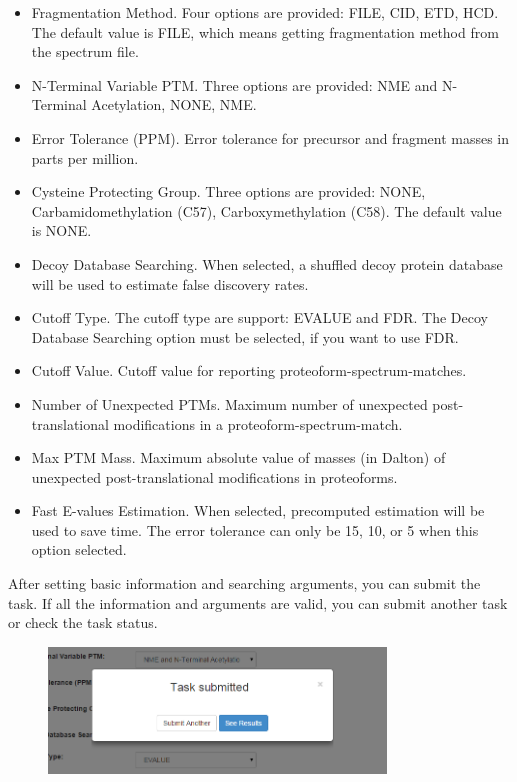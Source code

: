 \documentclass[12pt,letterpaper]{article}
\begin{document}
\begin{itemize}
\item Fragmentation Method. Four options are provided: FILE, CID, ETD, HCD. The
default value is FILE, which means getting fragmentation method from the
spectrum file.
\item N-Terminal Variable PTM. Three options are provided: NME and N-Terminal Acetylation, NONE, NME.
\item Error Tolerance (PPM). Error tolerance for precursor and fragment masses 
in parts per million.
\item Cysteine Protecting Group. Three options are provided: NONE, 
Carbamidomethylation (C57), Carboxymethylation (C58). The default value is NONE.
\item Decoy Database Searching. When selected, a shuffled decoy protein database
will be used to estimate false discovery rates.
\item Cutoff Type. The cutoff type are support: EVALUE and FDR. The Decoy Database Searching option must be selected, if you want to use FDR.
\item Cutoff Value. Cutoff value for reporting proteoform-spectrum-matches.
\item Number of Unexpected PTMs. Maximum number of unexpected post-translational modifications in a proteoform-spectrum-match.
\item Max PTM Mass. Maximum absolute value of masses (in Dalton) of unexpected post-translational modifications in proteoforms.
\item Fast E-values Estimation. When selected, precomputed estimation will be
used to save time. The error tolerance can only be 15, 10, or 5 when this option
selected.
\end{itemize}

After setting basic information and searching arguments, you can submit
the task. If all the information and arguments are valid, you can submit 
another task or check the task status.

\begin{figure}[H]
\begin{center}
    \includegraphics[width=0.8\textwidth]{fig/7.png}
\end{center}
\end{figure}
\end{document}
